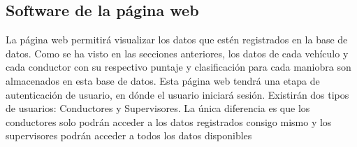 \subsection{Software de la página web}

La página web permitirá visualizar los datos que estén registrados en la base de datos. Como se ha visto en las secciones anteriores, los datos de cada vehículo y cada conductor con su respectivo puntaje y clasificación para cada maniobra son almacenados en esta base de datos. Esta página web tendrá una etapa de autenticación de usuario, en dónde el usuario iniciará sesión. Existirán dos tipos de usuarios: Conductores y Supervisores. La única diferencia es que los conductores solo podrán acceder a los datos registrados consigo mismo y los supervisores podrán acceder a todos los datos disponibles




















